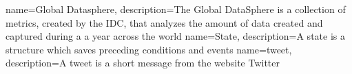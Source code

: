 {
   name=Global Datasphere,
   description={The Global DataSphere is a collection of metrics, created by the IDC, that analyzes the amount of data created and captured during a a year across the world}
}
 {
   name=State,
   description={A state is a structure which saves preceding conditions and events}
}
 {
   name=tweet,
   description={A tweet is a short message from the website Twitter}
}
